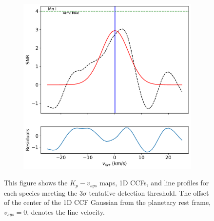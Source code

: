 \documentclass[twocolumn]{aastex631}
\begin{document}
\begin{figure}[ht!]
            \begin{subfigure}[b]{0.333\textwidth}\label{fig:1d-ccf-Mn-combined}
                \includegraphics[width=\textwidth]{plots-updated/line-profile/blue/KELT-20b.20190504.blue.Mn.SNR-Gaussian.pdf}
            \end{subfigure}


        \caption{This figure shows the $K_p-v_{sys}$ maps, 1D CCFs, and line profiles for each species meeting the ${3\sigma}$ tentative detection threshold. The offset of the center of the 1D CCF Gaussian from the planetary rest frame, ${v_{sys}}=0$, denotes the line velocity. 
    }
        

        \end{figure}



        
\end{document}
